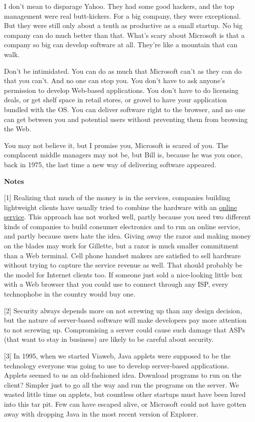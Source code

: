 I don't mean to disparage Yahoo. They had some good hackers, and the top
management were real butt-kickers. For a big company, they were
exceptional. But they were still only about a tenth as productive as a
small startup. No big company can do much better than that. What's scary
about Microsoft is that a company so big can develop software at all.
They're like a mountain that can walk.

Don't be intimidated. You can do as much that Microsoft can't as they
can do that you can't. And no one can stop you. You don't have to ask
anyone's permission to develop Web-based applications. You don't have to
do licensing deals, or get shelf space in retail stores, or grovel to
have your application bundled with the OS. You can deliver software
right to the browser, and no one can get between you and potential users
without preventing them from browsing the Web.

You may not believe it, but I promise you, Microsoft is scared of you.
The complacent middle managers may not be, but Bill is, because he was
you once, back in 1975, the last time a new way of delivering software
appeared.

\textbf{Notes}

{[}1{]} Realizing that much of the money is in the services, companies
building lightweight clients have usually tried to combine the hardware
with an \href{http://news.cnet.com/news/0-1006-200-3622600.html}{online
service}. This approach has not worked well, partly because you need two
different kinds of companies to build consumer electronics and to run an
online service, and partly because users hate the idea. Giving away the
razor and making money on the blades may work for Gillette, but a razor
is much smaller commitment than a Web terminal. Cell phone handset
makers are satisfied to sell hardware without trying to capture the
service revenue as well. That should probably be the model for Internet
clients too. If someone just sold a nice-looking little box with a Web
browser that you could use to connect through any ISP, every technophobe
in the country would buy one.

{[}2{]} Security always depends more on not screwing up than any design
decision, but the nature of server-based software will make developers
pay more attention to not screwing up. Compromising a server could cause
such damage that ASPs (that want to stay in business) are likely to be
careful about security.

{[}3{]} In 1995, when we started Viaweb, Java applets were supposed to
be the technology everyone was going to use to develop server-based
applications. Applets seemed to us an old-fashioned idea. Download
programs to run on the client? Simpler just to go all the way and run
the programs on the server. We wasted little time on applets, but
countless other startups must have been lured into this tar pit. Few can
have escaped alive, or Microsoft could not have gotten away with
dropping Java in the most recent version of Explorer.

